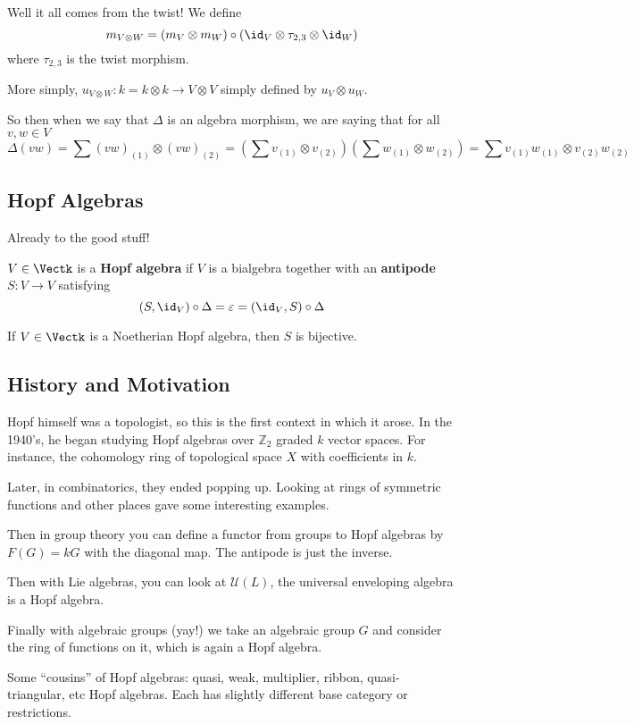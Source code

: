 \documentclass[12pt]{article}
\newcommand*{\Z}{
\mathbb{Z}
}
\begin{document}
Well it all comes from the twist! We define
\[m_{V\otimes W}=(m_V\otimes m_W)\circ(\id_V\otimes \tau_{2,3}\otimes \id_W)\]
where $\tau_{2,3}$ is the twist morphism.

More simply, $u_{V\otimes W}:k=k\otimes k\to V\otimes V$ simply defined by $u_V\otimes u_W$.

So then when we say that $\Delta$ is an algebra morphism, we are saying that for all $v,w\in V$
\[\Delta(vw)=\sum(vw)_{(1)}\otimes(vw)_{(2)}=(\sum v_{(1)}\otimes v_{(2)})(\sum w_{(1)}\otimes w_{(2)})=\sum v_{(1)}w_{(1)}\otimes v_{(2)}w_{(2)}\]

\subsection{Hopf Algebras}
Already to the good stuff!
\begin{defn}
	$V\in\Vectk$ is a \textbf{Hopf algebra} if $V$ is a bialgebra together with an \textbf{antipode}
	$S:V\to V$ satisfying
	\[(S,\id_V)\circ \Delta=\varepsilon=(\id_V,S)\circ\Delta\]
\end{defn}
\begin{conj}
	If $V\in\Vectk$ is a Noetherian Hopf algebra, then $S$ is bijective.
\end{conj}

\subsection{History and Motivation}
Hopf himself was a topologist, so this is the first context in which it arose. In the 1940's,
he began studying Hopf algebras over $\Z_2$ graded $k$ vector spaces. For instance, the 
cohomology ring of topological space $X$ with coefficients in $k$.

Later, in combinatorics, they ended popping up. Looking at rings of symmetric functions and other places
gave some interesting examples.

Then in group theory you can define a functor from groups to Hopf algebras by $F(G)=kG$
with the diagonal map. The antipode is just the inverse.

Then with Lie algebras, you can look at $\mathcal{U}(L)$, the universal enveloping algebra is a Hopf algebra.

Finally with algebraic groups (yay!) we take an algebraic group $G$ and consider the ring of functions on it, 
which is again a Hopf algebra.

\brk

Some ``cousins'' of Hopf algebras: quasi, weak, multiplier, ribbon, quasi-triangular, etc Hopf algebras. 
Each has slightly different base category or restrictions.
\end{document}
